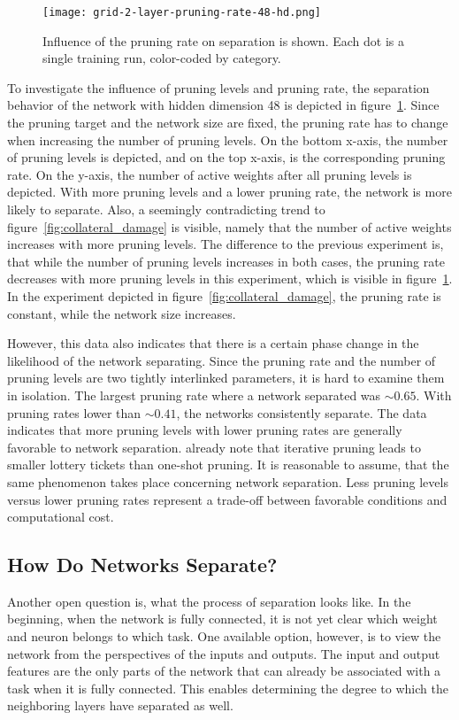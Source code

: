 \begin{figure}[ht] %
    \centering
    \texttt{[image: grid-2-layer-pruning-rate-48-hd.png]}
    \caption[Influence of pruning rate on separation]{
        Influence of the pruning rate on separation is shown.
        Each dot is a single training run, color-coded by category.
    }\label{fig:grid-2}
\end{figure}

To investigate the influence of pruning levels and pruning rate, the separation behavior of the network with hidden dimension 48 is depicted in figure~\ref{fig:grid-2}.
Since the pruning target and the network size are fixed, the pruning rate has to change when increasing the number of pruning levels.
On the bottom x-axis, the number of pruning levels is depicted, and on the top x-axis, is the corresponding pruning rate.
On the y-axis, the number of active weights after all pruning levels is depicted.
With more pruning levels and a lower pruning rate, the network is more likely to separate.
Also, a seemingly contradicting trend to figure~\ref{fig:collateral_damage} is visible, namely that the number of active weights increases with more pruning levels.
The difference to the previous experiment is, that while the number of pruning levels increases in both cases, the pruning rate decreases with more pruning levels in this experiment, which is visible in figure~\ref{fig:grid-2}. In the experiment depicted in figure~\ref{fig:collateral_damage}, the pruning rate is constant, while the network size increases.

However, this data also indicates that there is a certain phase change in the likelihood of the network separating.
Since the pruning rate and the number of pruning levels are two tightly interlinked parameters, it is hard to examine them in isolation.
The largest pruning rate where a network separated was $\sim0.65$. 
With pruning rates lower than $\sim0.41$, the networks consistently separate.
The data indicates that more pruning levels with lower pruning rates are generally favorable to network separation.
\textcite{LTH} already note that iterative pruning leads to smaller lottery tickets than one-shot pruning.
It is reasonable to assume, that the same phenomenon takes place concerning network separation.
Less pruning levels versus lower pruning rates represent a trade-off between favorable conditions and computational cost.

\subsection{How Do Networks Separate?}
Another open question is, what the process of separation looks like.
In the beginning, when the network is fully connected, it is not yet clear which weight and neuron belongs to which task.
One available option, however, is to view the network from the perspectives of the inputs and outputs.
The input and output features are the only parts of the network that can already be associated with a task when it is fully connected.
This enables determining the degree to which the neighboring layers have separated as well.

